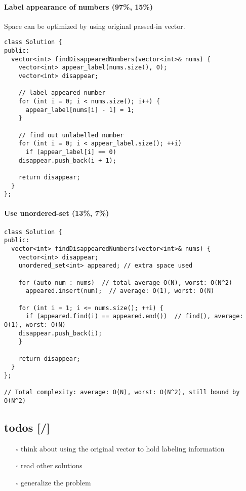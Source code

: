 \documentclass[11pt]{article}
\begin{document}
\paragraph{Label appearance of numbers (97\%, 15\%)}
\label{sec:orgdae61fe}
Space can be optimized by using original passed-in vector.
\begin{verbatim}
class Solution {
public:
  vector<int> findDisappearedNumbers(vector<int>& nums) {
    vector<int> appear_label(nums.size(), 0);
    vector<int> disappear;

    // label appeared number
    for (int i = 0; i < nums.size(); i++) {
      appear_label[nums[i] - 1] = 1;
    }

    // find out unlabelled number 
    for (int i = 0; i < appear_label.size(); ++i)
      if (appear_label[i] == 0)
	disappear.push_back(i + 1);

    return disappear;
  }
};
\end{verbatim}
\paragraph{Use unordered-set (13\%, 7\%)}
\label{sec:org6f9cbae}
\begin{verbatim}
class Solution {
public:
  vector<int> findDisappearedNumbers(vector<int>& nums) {
    vector<int> disappear;
    unordered_set<int> appeared; // extra space used

    for (auto num : nums)  // total average O(N), worst: O(N^2)
      appeared.insert(num);  // average: O(1), worst: O(N)

    for (int i = 1; i <= nums.size(); ++i) {
      if (appeared.find(i) == appeared.end())  // find(), average: O(1), worst: O(N)
	disappear.push_back(i);
    }

    return disappear;
  }
};

// Total complexity: average: O(N), worst: O(N^2), still bound by O(N^2)
\end{verbatim}
\subsection{todos [/]}
\label{sec:orge635161}
\begin{itemize}
\item[{$\square$}] think about using the original vector to hold labeling information
\item[{$\square$}] read other solutions
\item[{$\square$}] generalize the problem
\end{itemize}
\end{document}

